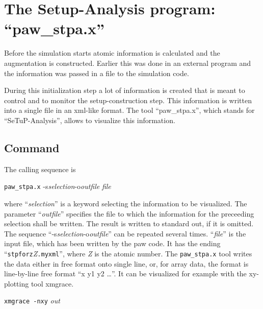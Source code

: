 \documentclass[final,12pt]{article}
\begin{document}
{{{{{{%
\newpage
\section{The Setup-Analysis program: ``paw\_stpa.x''}
Before the simulation starts atomic information is calculated and the
augmentation is constructed. Earlier this was done in an external
program and the information was passed in a file to the simulation code.

During this initialization step a lot of information is created that
is meant to control and to monitor the setup-construction step. This
information is written into a single file in an xml-like format. The
tool ``paw\_stpa.x'', which stands for ``SeTuP-Analysis'', allows to
visualize this information.

\subsection{Command}

The calling sequence is
\begin{center}
\verb|paw_stpa.x| 
\quad-s\quad\textit{selection}\quad\textrm{-o}\quad\textit{outfile} \quad\textit{file}
\end{center}
where ``\textit{selection}'' is a keyword selecting the information to
be visualized.  The parameter ``\textit{outfile}'' specifies the file
to which the information for the preceeding selection shall be
written. The result is written to standard out, if it is omitted.  The
sequence
``-s\quad\textit{selection}\quad\textrm{-o}\quad\textit{outfile}'' can
be repeated several times.  ``\textit{file}'' is the input file, which
has been written by the paw code. It has the ending
``\verb|stpforz|\textit{Z}\verb|.myxml|'', where \textit{Z} is the
atomic number. The \verb|paw_stpa.x| tool writes the data either in
free format onto single line, or, for array data, the format is
line-by-line free format ``x y1 y2 \ldots''.  It can be visualized for
example with the xy-plotting tool xmgrace.
\begin{center}
\verb|xmgrace -nxy| \textit{out}
\end{center}

}}}}}}
\end{document}
